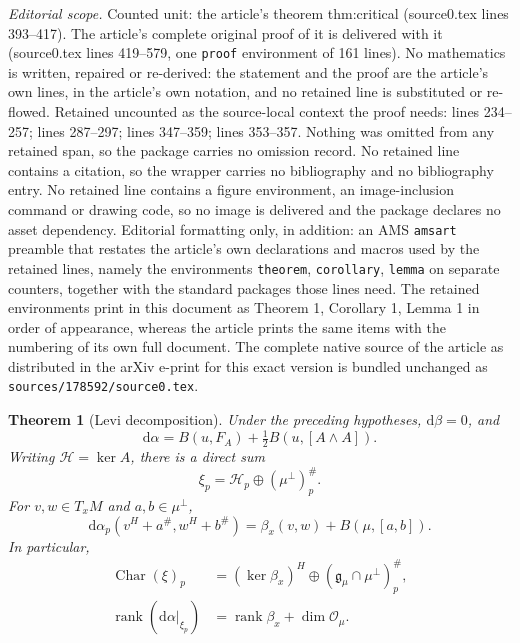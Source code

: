 \documentclass[10pt,a4paper]{amsart}
\newtheorem{theorem}{Theorem}
\newcommand{\Char}{\operatorname{Char}}
\newcommand{\D}{\xi}
\newcommand{\Horz}{\mathcal H}
\newcommand{\dd}{\mathrm d}
\newcommand{\g}{\mathfrak g}
\newcommand{\rank}{\operatorname{rank}}
\begin{document}
\noindent\textit{Editorial scope.} Counted unit: the article's theorem thm:critical (source0.tex lines 393--417). The article's complete original proof of it is delivered with it (source0.tex lines 419--579, one \texttt{proof} environment of 161 lines). No mathematics is written, repaired or re-derived: the statement and the proof are the article's own lines, in the article's own notation, and no retained line is substituted or re-flowed.  Retained uncounted as the source-local context the proof needs: lines 234--257; lines 287--297; lines 347--359; lines 353--357.  Nothing was omitted from any retained span, so the package carries no omission record.  No retained line contains a citation, so the wrapper carries no bibliography and no bibliography entry.  No retained line contains a figure environment, an image-inclusion command or drawing code, so no image is delivered and the package declares no asset dependency.  Editorial formatting only, in addition: an AMS \texttt{amsart} preamble that restates the article's own declarations and macros used by the retained lines, namely the environments \texttt{theorem}, \texttt{corollary}, \texttt{lemma} on separate counters, together with the standard packages those lines need.  The retained environments print in this document as Theorem 1, Corollary 1, Lemma 1 in order of appearance, whereas the article prints the same items with the numbering of its own full document.  The complete native source of the article as distributed in the arXiv e-print for this exact version is bundled unchanged as \texttt{sources/178592/source0.tex}.
\begin{theorem}[Levi decomposition]\label{thm:rank}
Under the preceding hypotheses, $\dd\beta=0$, and
\begin{equation}\label{eq:dalpha}
 \dd\alpha=B(u,F_A)+\tfrac12B(u,[A\wedge A]).
\end{equation}
Writing $\Horz=\ker A$, there is a direct sum
\begin{equation}\label{eq:splitD}
 \D_p=\Horz_p\oplus(\mu^\perp)^\#_p.
\end{equation}
For $v,w\in T_xM$ and $a,b\in\mu^\perp$,
\begin{equation}\label{eq:leviblock}
 \dd\alpha_p(v^H+a^\#,w^H+b^\#)
 =\beta_x(v,w)+B(\mu,[a,b]).
\end{equation}
In particular,
\begin{align}
 \Char(\D)_p
 &= (\ker\beta_x)^H\oplus(\g_\mu\cap\mu^\perp)^\#_p,
 \label{eq:char}\\
 \rank(\dd\alpha|_{\D_p})
 &=\rank\beta_x+\dim\mathcal O_\mu.
 \label{eq:rank}
\end{align}
\end{theorem}
\end{document}
